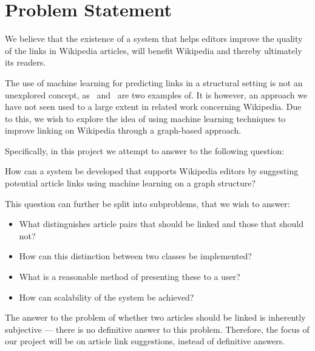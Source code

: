 \section{Problem Statement}\label{sec:problem_statement}
We believe that the existence of a system that helps editors improve the quality of the links in Wikipedia articles, will benefit Wikipedia and thereby ultimately its readers.

The use of machine learning for predicting links in a structural setting is not an unexplored concept, as~\cite{tang2015line} and~\cite{al2006link} are two examples of. It is however, an approach we have not seen used to a large extent in related work concerning Wikipedia. Due to this, we wish to explore the idea of using machine learning techniques to improve linking on Wikipedia through a graph-based approach.

Specifically, in this project we attempt to answer to the following question:

\begin{formal}
How can a system be developed that supports Wikipedia editors by suggesting potential article links using machine learning on a graph structure?
\end{formal}

This question can further be split into subproblems, that we wish to answer:
\begin{itemize}
  \item What distinguishes article pairs that should be linked and those that should not?
  \item How can this distinction between two classes be implemented?
  \item What is a reasonable method of presenting these to a user?
  \item How can scalability of the system be achieved?
\end{itemize}

The answer to the problem of whether two articles should be linked is inherently subjective --- there is no definitive answer to this problem. Therefore, the focus of our project will be on article link suggestions, instead of definitive answers.



